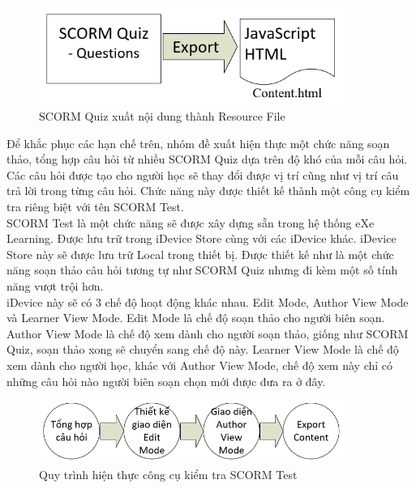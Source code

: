 	\begin{center}
	\begin{figure}[htp]
		\begin{center}
			\includegraphics[width=10cm]{Chapter4/Pictures/picture47.png}
		\end{center}
		\caption{SCORM Quiz xuất nội dung thành Resource File}
		\label{refpicture55}
	\end{figure}
\end{center}
	
	Để khắc phục các hạn chế trên, nhóm đề xuất hiện thực một chức năng soạn thảo, tổng hợp câu hỏi từ nhiều SCORM Quiz dựa trên độ khó của mỗi câu hỏi. Các câu hỏi được tạo cho người học sẽ thay đổi được vị trí cũng như vị trí câu trả lời trong từng câu hỏi. Chức năng này được thiết kế thành một công cụ kiểm tra riêng biệt với tên SCORM Test.\\
	
	SCORM Test là một chức năng sẽ được xây dựng sẵn trong hệ thống eXe Learning. Được lưu trữ trong iDevice Store cùng với các iDevice khác. iDevice Store này sẽ được lưu trữ Local trong thiết bị. Được thiết kế như là một chức năng soạn thảo câu hỏi tương tự như SCORM Quiz nhưng đi kèm một số tính năng vượt trội hơn.\\
	
	iDevice này sẽ có 3 chế độ hoạt động khác nhau. Edit Mode, Author View Mode và Learner View Mode. Edit Mode là chế độ soạn thảo cho người biên soạn. Author View Mode là chế độ xem dành cho người soạn thảo, giống như SCORM Quiz, soạn thảo xong sẽ chuyển sang chế độ này. Learner View Mode là chế độ xem dành cho người học, khác với Author View Mode, chế độ xem này chỉ có những câu hỏi nào người biên soạn chọn mới được đưa ra ở đây.

	\begin{center}
	\begin{figure}[htp]
		\begin{center}
			\includegraphics[width=10cm]{Chapter4/Pictures/picture48.png}
		\end{center}
		\caption{Quy trình hiện thực công cụ kiểm tra SCORM Test}
		\label{refpicture56}
	\end{figure}
\end{center}

